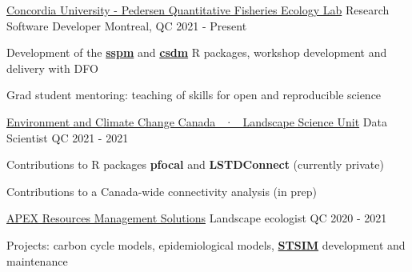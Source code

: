 \vspace{3pt}

\vspace{-2pt}
\begin{cventries}

  \cventry
    {\href{https://www.pedersenfisherieslab.com/}{Concordia University - Pedersen Quantitative Fisheries Ecology Lab}} %
    {Research Software Developer} %
    {Montreal, QC} %
    {2021 - Present} %
    {
      \begin{cvitems} %
        \item {Development of the \href{https://github.com/pedersen-fisheries-lab/sspm}{\textbf{sspm}} and \href{https://github.com/pedersen-fisheries-lab/csdm}{\textbf{csdm}} R packages, workshop development and delivery with DFO}
        \item {Grad student mentoring: teaching of skills for open and reproducible science}
      \end{cvitems}
    }

  \cventry
  {\href{https://www.canada.ca/en/environment-climate-change/services/wildlife-research-landscape-science.html}{Environment and Climate Change Canada ~·~ Landscape Science Unit}} %
  {Data Scientist} %
  {QC} %
  {2021 - 2021} %
  {
    \begin{cvitems} %
      \item {Contributions to R packages \textbf{pfocal} and \textbf{LSTDConnect} (currently private)}
      \item {Contributions to a Canada-wide connectivity analysis (in prep)}
    \end{cvitems}
  }

  \cventry
  {\href{https://apexrms.com/}{APEX Resources Management Solutions}} %
  {Landscape ecologist} %
  {QC} %
  {2020 - 2021} %
  {
    \begin{cvitems} %
      \item {Projects: carbon cycle models, epidemiological models, \href{http://docs.stsim.net/}{\textbf{STSIM}} development and maintenance}
    \end{cvitems}
  }

\end{cventries}


